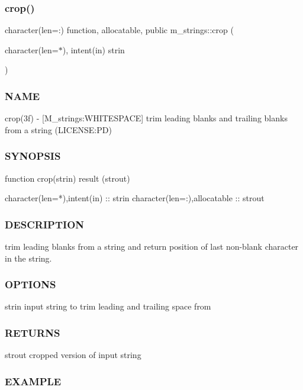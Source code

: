 \subsubsection{\texorpdfstring{crop()}{crop()}}
{\footnotesize\ttfamily character(len=\+:) function, allocatable, public m\+\_\+strings\+::crop (\begin{DoxyParamCaption}\item[{character(len=$\ast$), intent(in)}]{strin }\end{DoxyParamCaption})}



\subsubsection*{N\+A\+ME}

crop(3f) -\/ \mbox{[}M\+\_\+strings\+:W\+H\+I\+T\+E\+S\+P\+A\+CE\mbox{]} trim leading blanks and trailing blanks from a string (L\+I\+C\+E\+N\+SE\+:PD) 

\subsubsection*{S\+Y\+N\+O\+P\+S\+IS}

\begin{DoxyVerb}function crop(strin) result (strout)

 character(len=*),intent(in)  :: strin
 character(len=:),allocatable :: strout
\end{DoxyVerb}
 \subsubsection*{D\+E\+S\+C\+R\+I\+P\+T\+I\+ON}

trim leading blanks from a string and return position of last non-\/blank character in the string. \subsubsection*{O\+P\+T\+I\+O\+NS}

strin input string to trim leading and trailing space from \subsubsection*{R\+E\+T\+U\+R\+NS}

strout cropped version of input string \subsubsection*{E\+X\+A\+M\+P\+LE}

